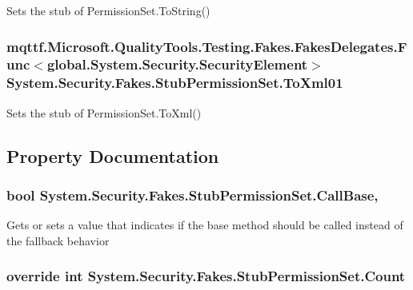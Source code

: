 Sets the stub of Permission\-Set.\-To\-String()

\hypertarget{class_system_1_1_security_1_1_fakes_1_1_stub_permission_set_a38efa6ff26ec8c7f55ed213e17283e13}{
\subsubsection[{To\-Xml01}]{\setlength{\rightskip}{0pt plus 5cm}mqttf.\-Microsoft.\-Quality\-Tools.\-Testing.\-Fakes.\-Fakes\-Delegates.\-Func$<$global.\-System.\-Security.\-Security\-Element$>$ System.\-Security.\-Fakes.\-Stub\-Permission\-Set.\-To\-Xml01}}\label{class_system_1_1_security_1_1_fakes_1_1_stub_permission_set_a38efa6ff26ec8c7f55ed213e17283e13}


Sets the stub of Permission\-Set.\-To\-Xml()



\subsection{Property Documentation}
\hypertarget{class_system_1_1_security_1_1_fakes_1_1_stub_permission_set_a9883d7fe11762e093ec314156d4ba540}{
\subsubsection[{Call\-Base}]{\setlength{\rightskip}{0pt plus 5cm}bool System.\-Security.\-Fakes.\-Stub\-Permission\-Set.\-Call\-Base\hspace{0.3cm}{\ttfamily [get]}, {\ttfamily [set]}}}\label{class_system_1_1_security_1_1_fakes_1_1_stub_permission_set_a9883d7fe11762e093ec314156d4ba540}


Gets or sets a value that indicates if the base method should be called instead of the fallback behavior

\hypertarget{class_system_1_1_security_1_1_fakes_1_1_stub_permission_set_a914e1ce606982d00dd59cc1c72d75be3}{
\subsubsection[{Count}]{\setlength{\rightskip}{0pt plus 5cm}override int System.\-Security.\-Fakes.\-Stub\-Permission\-Set.\-Count\hspace{0.3cm}{\ttfamily [get]}}}\label{class_system_1_1_security_1_1_fakes_1_1_stub_permission_set_a914e1ce606982d00dd59cc1c72d75be3}


